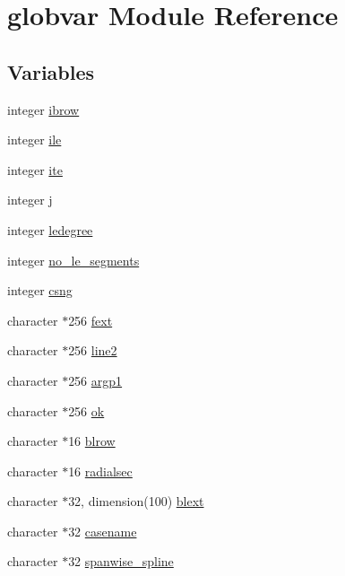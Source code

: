 \hypertarget{namespaceglobvar}{}\section{globvar Module Reference}
\label{namespaceglobvar}
\subsection*{Variables}
\begin{DoxyCompactItemize}
\item 
integer \hyperlink{namespaceglobvar_a074233db9e9693042a79a9e4cd4f84e2}{ibrow}
\item 
integer \hyperlink{namespaceglobvar_aefeb81e8846810feb44bb79f95cac5c2}{ile}
\item 
integer \hyperlink{namespaceglobvar_a67308a23e61fb67077fcb6216e72bc84}{ite}
\item 
integer \hyperlink{namespaceglobvar_aa6b683519cf0d2993847908919dd2d72}{j}
\item 
integer \hyperlink{namespaceglobvar_ab47e00ad68c86a9aac86e082da7398f1}{ledegree}
\item 
integer \hyperlink{namespaceglobvar_a64988ba2eed57cebc3d95939e33ee75e}{no\+\_\+le\+\_\+segments}
\item 
integer \hyperlink{namespaceglobvar_a5c850302345bc4b2d45af2d4bb80f58f}{csng}
\item 
character $\ast$256 \hyperlink{namespaceglobvar_a91c6656f75994719c2ef6ca7d7b88ded}{fext}
\item 
character $\ast$256 \hyperlink{namespaceglobvar_a1620db6ffc17c057934b90f70421dd96}{line2}
\item 
character $\ast$256 \hyperlink{namespaceglobvar_a3ee916788a2f55473d7d6dd7ba5137f7}{argp1}
\item 
character $\ast$256 \hyperlink{namespaceglobvar_a61ebbf94ac2ff67042612526d08b69f5}{ok}
\item 
character $\ast$16 \hyperlink{namespaceglobvar_ae058016a63919ba09dda0290e83e60a0}{blrow}
\item 
character $\ast$16 \hyperlink{namespaceglobvar_a62eb55ad192fba73ef6d49482206212e}{radialsec}
\item 
character $\ast$32, dimension(100) \hyperlink{namespaceglobvar_afebc24dd143d18989fbeb7223a277ab8}{blext}
\item 
character $\ast$32 \hyperlink{namespaceglobvar_a0a6c526cbc0a41ebd6f3667a0a9183ba}{casename}
\item 
character $\ast$32 \hyperlink{namespaceglobvar_a6a1dfe25b49d1fa165e1f63466b92629}{spanwise\+\_\+spline}

\end{DoxyCompactItemize}
